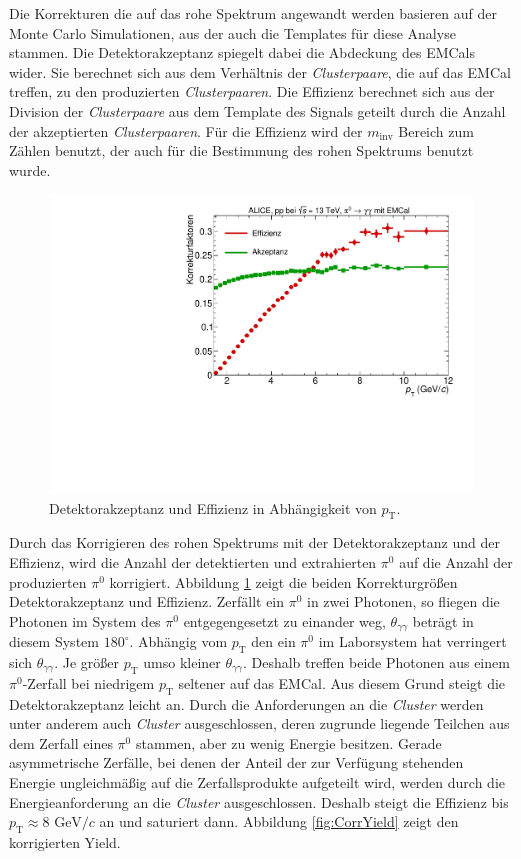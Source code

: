 Die Korrekturen die auf das rohe Spektrum angewandt werden basieren auf der Monte Carlo Simulationen, aus der auch die Templates für diese Analyse stammen.
\newline
Die Detektorakzeptanz spiegelt dabei die Abdeckung des EMCals wider.
Sie berechnet sich aus dem Verhältnis der \textit{Clusterpaare}, die auf das EMCal treffen, zu den produzierten \textit{Clusterpaaren}.
\newline
Die Effizienz berechnet sich aus der Division der \textit{Clusterpaare} aus dem Template des Signals geteilt durch die Anzahl der akzeptierten \textit{Clusterpaaren}.
Für die Effizienz wird der $m_\text{inv}$ Bereich zum Zählen benutzt, der auch für die Bestimmung des rohen Spektrums benutzt wurde.
\begin{figure}[t!]
\centering
\includegraphics[width=.65\linewidth]{Korrekturfaktoren_Data_2016.pdf}
\caption{Detektorakzeptanz und Effizienz in Abhängigkeit von $p_\text{T}$.
}
\label{fig:Korrekturen}
\end{figure}
\newline
Durch das Korrigieren des rohen Spektrums mit der Detektorakzeptanz und der Effizienz, wird die Anzahl der detektierten und extrahierten $\pi^{0}$ auf die Anzahl der produzierten $\pi^{0}$ korrigiert.
Abbildung \ref{fig:Korrekturen} zeigt die beiden Korrekturgrößen Detektorakzeptanz und Effizienz.
\newline
Zerfällt ein $\pi^{0}$ in zwei Photonen, so fliegen die Photonen im System des $\pi^{0}$ entgegengesetzt zu einander weg, $\theta_{\gamma\gamma}$ beträgt in diesem System $180^{\circ}$.
Abhängig vom $p_\text{T}$ den ein $\pi^{0}$ im Laborsystem hat verringert sich $\theta_{\gamma\gamma}$.
Je größer $p_\text{T}$ umso kleiner $\theta_{\gamma\gamma}$.
Deshalb treffen beide Photonen aus einem $\pi^{0}$-Zerfall bei niedrigem $p_\text{T}$ seltener auf das EMCal.
Aus diesem Grund steigt die Detektorakzeptanz leicht an.
\newline
Durch die Anforderungen an die \textit{Cluster} werden unter anderem auch \textit{Cluster} ausgeschlossen, deren zugrunde liegende Teilchen aus dem Zerfall eines $\pi^{0}$ stammen, aber zu wenig Energie besitzen.
Gerade asymmetrische Zerfälle, bei denen der Anteil der zur Verfügung stehenden Energie ungleichmäßig auf die Zerfallsprodukte aufgeteilt wird, werden durch die Energieanforderung an die \textit{Cluster} ausgeschlossen.
Deshalb steigt die Effizienz bis $p_\text{T} \approx 8 \text{ GeV}/c$ an und saturiert dann.
\newline
Abbildung \ref{fig:CorrYield} zeigt den korrigierten Yield.
